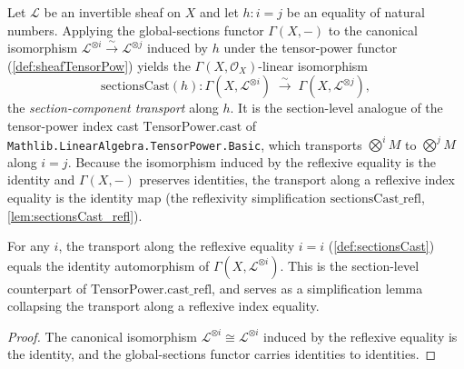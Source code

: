 \begin{definition}
  \label{def:sectionsCast}
  Let \(\mathcal{L}\) be an invertible sheaf on \(X\) and let \(h : i = j\) be an
  equality of natural numbers. Applying the global-sections functor
  \(\Gamma(X,-)\) to the canonical isomorphism
  \(\mathcal{L}^{\otimes i} \xrightarrow{\sim} \mathcal{L}^{\otimes j}\) induced by
  \(h\) under the tensor-power functor (\cref{def:sheafTensorPow}) yields the
  \(\Gamma(X,\mathcal{O}_X)\)-linear isomorphism
  \[
    \mathrm{sectionsCast}(h) :
    \Gamma(X, \mathcal{L}^{\otimes i}) \;\xrightarrow{\ \sim\ }\;
    \Gamma(X, \mathcal{L}^{\otimes j}),
  \]
  the \emph{section-component transport} along \(h\). It is the section-level
  analogue of the tensor-power index cast \(\mathrm{TensorPower.cast}\) of
  \texttt{Mathlib.LinearAlgebra.TensorPower.Basic}, which transports
  \(\bigotimes^{i} M\) to \(\bigotimes^{j} M\) along \(i = j\). Because the
  isomorphism induced by the reflexive equality is the identity and
  \(\Gamma(X,-)\) preserves identities, the transport along a reflexive index
  equality is the identity map (the reflexivity simplification
  \(\mathrm{sectionsCast\_refl}\), \cref{lem:sectionsCast_refl}).
\end{definition}

\begin{lemma}
  \label{lem:sectionsCast_refl}
  For any \(i\), the transport along the reflexive equality \(i = i\)
  (\cref{def:sectionsCast}) equals the identity automorphism of
  \(\Gamma(X, \mathcal{L}^{\otimes i})\). This is the section-level counterpart of
  \(\mathrm{TensorPower.cast\_refl}\), and serves as a simplification lemma
  collapsing the transport along a reflexive index equality.
\end{lemma}

\begin{proof}
  The canonical isomorphism
  \(\mathcal{L}^{\otimes i} \cong \mathcal{L}^{\otimes i}\) induced by the
  reflexive equality is the identity, and the global-sections functor carries
  identities to identities.
\end{proof}

